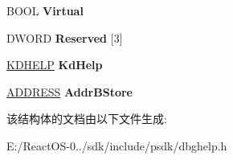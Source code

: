 \begin{DoxyCompactItemize}
B\+O\+OL {\bfseries Virtual}
\item 
\mbox{\label{struct___s_t_a_c_k_f_r_a_m_e_a3c32b883340f4f2a4c59c141fb0e0836}} 
D\+W\+O\+RD {\bfseries Reserved} \mbox{[}3\mbox{]}
\item 
\mbox{\label{struct___s_t_a_c_k_f_r_a_m_e_afd8fd26823d170a163930ae5ca3c159b}} 
\hyperlink{struct___k_d_h_e_l_p}{K\+D\+H\+E\+LP} {\bfseries Kd\+Help}
\item 
\mbox{\label{struct___s_t_a_c_k_f_r_a_m_e_a85e9e6b664acf2833ecfe7af63bba33c}} 
\hyperlink{struct__tag_a_d_d_r_e_s_s}{A\+D\+D\+R\+E\+SS} {\bfseries Addr\+B\+Store}
\end{DoxyCompactItemize}


该结构体的文档由以下文件生成\+:\begin{DoxyCompactItemize}
\item 
E\+:/\+React\+O\+S-\/0../sdk/include/psdk/dbghelp.\+h\end{DoxyCompactItemize}
